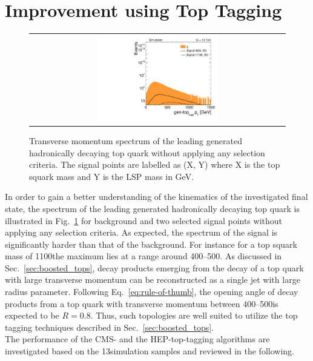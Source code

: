 \section{Improvement using Top Tagging}
\label{sec:stop_toptagging}
\begin{figure}[!t]
  \centering
  \begin{tabular}{c}
                \includegraphics[width=0.49\textwidth]{figures/Stop_NoCuts_leading_had_t_ptgen.pdf} 
  \end{tabular}
  \caption{Transverse momentum spectrum of the leading generated hadronically decaying top quark without applying any selection criteria. The signal points are labelled as (X, Y) where X is the top squark mass and Y is the LSP mass in GeV.}
  \label{fig:stop_gen_top_pt}
\end{figure} 
In order to gain a better understanding of the kinematics of the investigated final state, the \pt spectrum of the leading generated  hadronically decaying top quark is illustrated in Fig.~\ref{fig:stop_gen_top_pt} for \ttbar background and two selected signal points without applying any selection criteria. As expected, the \pt spectrum of the signal is significantly harder than that of the \ttbar background. For instance for a top squark mass of 1100\gev the maximum lies at a \pt range around 400--500\gev. As discussed in Sec.~\ref{sec:boosted_tops}, decay products emerging from the decay of a top quark with large transverse momentum can be reconstructed as a single jet with large radius parameter. Following Eq.~\ref{eq:rule-of-thumb}, the opening angle of decay products from a top quark with transverse momentum between 400--500\gev is expected to be $R = 0.8$. Thus, such topologies are well suited to utilize the top tagging techniques described in Sec.~\ref{sec:boosted_tops}. \\
The performance of the CMS- and the HEP-top-tagging algorithms are investigated based on the 13\tev simulation samples and reviewed in the following. 
